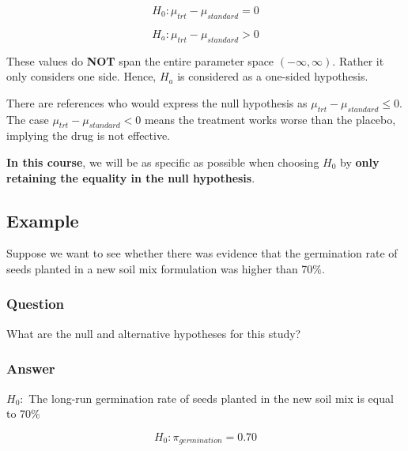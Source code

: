\documentclass[
  letterpaper,
  DIV=11,
  numbers=noendperiod]{scrartcl}
\begin{document}
\[
H_0: \mu_{trt} - \mu_{standard} = 0
\]

\[
H_a: \mu_{trt} -\mu_{standard} >0
\]

These values do \textbf{NOT} span the entire parameter space
\((-\infty,\infty)\). Rather it only considers one side. Hence, \(H_a\)
is considered as a one-sided hypothesis.

\begin{tcolorbox}[enhanced jigsaw, bottomtitle=1mm, colback=white, opacityback=0, leftrule=.75mm, opacitybacktitle=0.6, coltitle=black, left=2mm, colframe=quarto-callout-tip-color-frame, toptitle=1mm, colbacktitle=quarto-callout-tip-color!10!white, titlerule=0mm, title=\textcolor{quarto-callout-tip-color}{\faLightbulb}\hspace{0.5em}{Tip}, arc=.35mm, rightrule=.15mm, breakable, bottomrule=.15mm, toprule=.15mm]

There are references who would express the null hypothesis as
\(\mu_{trt}-\mu_{standard} \leq 0\). The case
\(\mu_{trt}-\mu_{standard} < 0\) means the treatment works worse than
the placebo, implying the drug is not effective.

\textbf{In this course}, we will be as specific as possible when
choosing \(H_0\) by \textbf{only retaining the equality in the null
hypothesis}.

\end{tcolorbox}

\subsection{Example}\label{example-1}

Suppose we want to see whether there was evidence that the germination
rate of seeds planted in a new soil mix formulation was higher than
70\%.

\subsubsection{Question}

What are the null and alternative hypotheses for this study?

\subsubsection{Answer}

\(H_0:\) The long-run germination rate of seeds planted in the new soil
mix is equal to 70\%

\[
H_0: \pi_{germination} = 0.70
\]
\end{document}
